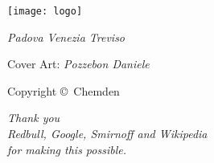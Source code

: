 \begin{fullpaper}
\pagestyle{empty}

\begingroup
{}
\vspace*{5cm}

\begin{center}
{\fontsize{36pt}{43pt}\selectfont \color{Secondary} \sc \printitle}

\vspace{2cm}

\printedition

\vspace{2cm}

{\Large \sc\printauthor}
\end{center}

\vspace{6cm}

\begin{center}
\texttt{[image: logo]}

\vspace*{1cm}

\it Padova Venezia Treviso
\end{center}
\endgroup

\cleardoublepage

\begingroup
\pagestyle{empty}

\vspace*{1cm}


\begin{raggedright}
Cover Art: \textit{Pozzebon Daniele}
\end{raggedright}

\vspace*{1cm}

\begin{raggedright}
Copyright \copyright\ Chemden \the\year{}
\end{raggedright}

\vspace*{1cm}

\disclaimer

\vfill

\creativecommons

\cleardoublepage
\endgroup

\begingroup
{}
{}
\vspace*{4cm}

\begin{center}
\it Thank you\\ Redbull, Google, Smirnoff and Wikipedia\\ for making this possible.
\end{center}


\end{fullpaper}
